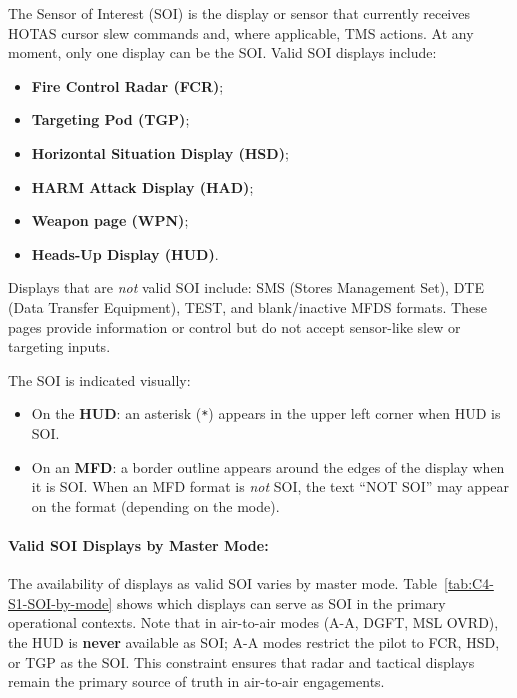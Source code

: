\documentclass[11pt,a4paper]{article}
\begin{document}
The Sensor of Interest (SOI) is the display or sensor that currently receives HOTAS cursor slew commands and, where applicable, TMS actions. At any moment, only one display can be the SOI. Valid SOI displays include:

\begin{itemize}
    \item \textbf{Fire Control Radar (FCR)};
    \item \textbf{Targeting Pod (TGP)};
    \item \textbf{Horizontal Situation Display (HSD)};
    \item \textbf{HARM Attack Display (HAD)};
    \item \textbf{Weapon page (WPN)};
    \item \textbf{Heads-Up Display (HUD)}.
\end{itemize}

Displays that are \textit{not} valid SOI include: SMS (Stores Management Set), DTE (Data Transfer Equipment), TEST, and blank/inactive MFDS formats. These pages provide information or control but do not accept sensor-like slew or targeting inputs.

The SOI is indicated visually:
\begin{itemize}
    \item On the \textbf{HUD}: an asterisk (\texttt{*}) appears in the upper left corner when HUD is SOI.
    \item On an \textbf{MFD}: a border outline appears around the edges of the display when it is SOI. When an MFD format is \textit{not} SOI, the text ``NOT SOI'' may appear on the format (depending on the mode).
\end{itemize}

\paragraph{Valid SOI Displays by Master Mode:}
The availability of displays as valid SOI varies by master mode. Table~\ref{tab:C4-S1-SOI-by-mode} shows which displays can serve as SOI in the primary operational contexts. Note that in air-to-air modes (A-A, DGFT, MSL OVRD), the HUD is \textbf{never} available as SOI; A-A modes restrict the pilot to FCR, HSD, or TGP as the SOI. This constraint ensures that radar and tactical displays remain the primary source of truth in air-to-air engagements.

\small
\renewcommand{\arraystretch}{1.2}
\end{document}
